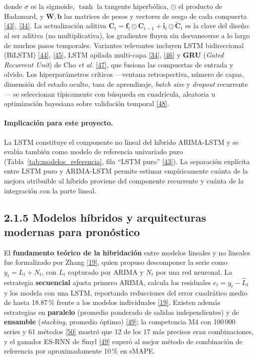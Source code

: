 \documentclass[12pt,letterpaper]{report}
\newcommand{\cita}[1]{\hyperref[bib:#1]{[#1]}}
\begin{document}
donde $\sigma$ es la sigmoide, $\tanh$ la tangente hiperbólica, $\odot$ el producto de Hadamard, y $\mathbf{W}, \mathbf{b}$ las matrices de pesos y vectores de sesgo de cada compuerta \cita{43}, \cita{34}. La actualización aditiva $\mathbf{C}_t = \mathbf{f}_t \odot \mathbf{C}_{t-1} + \mathbf{i}_t \odot \tilde{\mathbf{C}}_t$ es la clave del diseño: al ser aditiva (no multiplicativa), los gradientes fluyen sin desvanecerse a lo largo de muchos pasos temporales. Variantes relevantes incluyen LSTM bidireccional (BiLSTM) \cita{44}, \cita{45}, LSTM apilada multi-capa \cita{34}, \cita{46} y \textbf{GRU} (\textit{Gated Recurrent Unit}) de Cho \textit{et al.} \cita{47}, que fusiona las compuertas de entrada y olvido. Los hiperparámetros críticos ---ventana retrospectiva, número de capas, dimensión del estado oculto, tasa de aprendizaje, \textit{batch size} y \textit{dropout} recurrente--- se seleccionan típicamente con búsqueda en cuadrícula, aleatoria u optimización bayesiana sobre validación temporal \cita{48}.

\paragraph{Implicación para este proyecto.} La LSTM constituye el componente no lineal del híbrido ARIMA-LSTM y se evalúa también como modelo de referencia univariado puro (Tabla~\ref{tab:modelos_referencia}, fila ``LSTM puro'' \cita{43}). La separación explícita entre LSTM puro y ARIMA-LSTM permite estimar empíricamente cuánta de la mejora atribuible al híbrido proviene del componente recurrente y cuánta de la integración con la parte lineal.

\subsection{2.1.5 Modelos híbridos y arquitecturas modernas para pronóstico}

El \textbf{fundamento teórico de la hibridación} entre modelos lineales y no lineales fue formalizado por Zhang \cita{19}, quien propuso descomponer la serie como $y_t = L_t + N_t$, con $L_t$ capturado por ARIMA y $N_t$ por una red neuronal. La estrategia \textbf{secuencial} ajusta primero ARIMA, calcula los residuales $e_t = y_t - \hat{L}_t$ y los modela con una LSTM, reportando reducciones del error cuadrático medio de hasta 18.87\,\% frente a los modelos individuales \cita{19}. Existen además estrategias en \textbf{paralelo} (promedio ponderado de salidas independientes) y de \textbf{ensamble} (\textit{stacking}, promedio óptimo) \cita{49}; la competencia M4 con 100\,000 series y 61 métodos \cita{50} mostró que 12 de los 17 más precisos eran combinaciones, y el ganador ES-RNN de Smyl \cita{49} superó al mejor método de combinación de referencia por aproximadamente 10\,\% en sMAPE.
\end{document}
